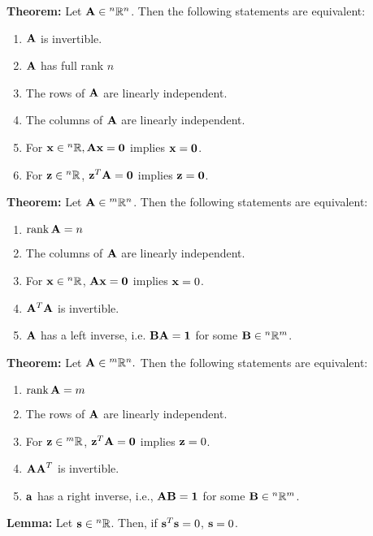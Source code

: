 \documentclass{article}
\begin{document}
    \begin{minipage}[t]{.45\textwidth} %
        \textbf{Theorem:} Let $\mathbf{A} \in {^n}\mathbb{R}^n$. Then the following statements are equivalent:
        \begin{enumerate}
            \item $\mathbf{A}$ is invertible.
            \item $\mathbf{A}$ has full rank $n$
            \item The rows of $\mathbf{A}$ are linearly independent.
            \item The columns of $\mathbf{A}$ are linearly independent.
            \item For $\mathbf{x} \in {^n}\mathbb{R}, \mathbf{Ax}=\mathbf{0}$ implies $\mathbf{x}=\mathbf{0}$.
            \item For $\mathbf{z} \in {^n}\mathbb{R}$, $\mathbf{z}^T\mathbf{A} = \mathbf{0}$ implies $\mathbf{z}=\mathbf{0}$.
        \end{enumerate}
        \vspace{2mm}
        
        \textbf{Theorem:} Let $\mathbf{A} \in {^m}\mathbb{R}^n$. Then the following statements are equivalent:
        \begin{enumerate}
            \item $\rank \mathbf{A} = n$
            \item The columns of $\mathbf{A}$ are linearly independent.
            \item For $\mathbf{x} \in {^n}\mathbb{R}$, $\mathbf{Ax}=\mathbf{0}$ implies $\mathbf{x}=0$.
            \item $\mathbf{A}^T\mathbf{A}$ is invertible.
            \item $\mathbf{A}$ has a left inverse, i.e. $\mathbf{BA}=\mathbf{1}$ for some $\mathbf{B} \in {^n}\mathbb{R}^m$.
        \end{enumerate}
        \vspace{2mm}
        \textbf{Theorem:} Let $\mathbf{A} \in {^m}\mathbb{R}^n.$ Then the following statements are equivalent:
        \begin{enumerate}
            \item $\rank \mathbf{A} = m$
            \item The rows of $\mathbf{A}$ are linearly independent.
            \item For $\mathbf{z} \in {^m}\mathbb{R}$, $\mathbf{z}^T\mathbf{A} = \mathbf{0}$ implies $\mathbf{z}=0$.
            \item $\mathbf{AA}^T$ is invertible.
            \item $\mathbf{a}$ has a right inverse, i.e., $\mathbf{AB}=\mathbf{1}$ for some $\mathbf{B} \in {^n}\mathbb{R}^m$.
        \end{enumerate}
        \textbf{Lemma:} Let $\mathbf{s} \in {^n}\mathbb{R}$. Then, if $\mathbf{s}^T\mathbf{s}=0$, $\mathbf{s}=0$.
        \vspace{2mm}


    \end{minipage} %
\end{document}
